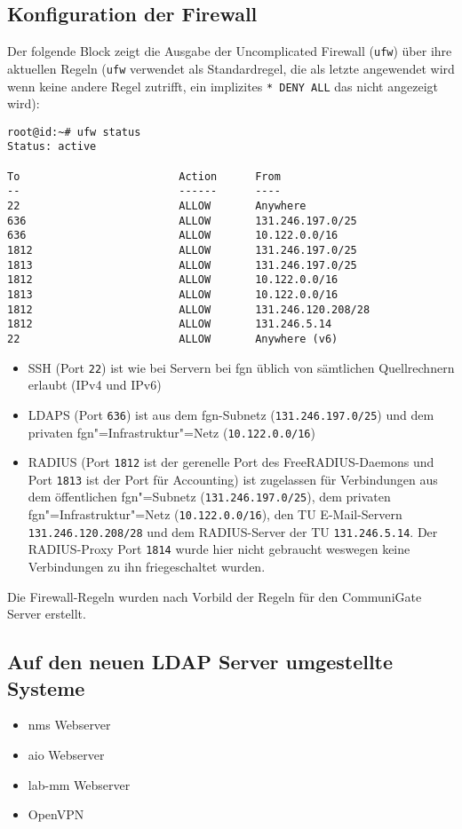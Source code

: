 \subsection{Konfiguration der Firewall}
Der folgende Block zeigt die Ausgabe der Uncomplicated Firewall (\texttt{ufw}) über ihre aktuellen Regeln (\texttt{ufw} verwendet als Standardregel, die als letzte angewendet wird wenn keine andere Regel zutrifft, ein implizites \texttt{* DENY ALL} das nicht angezeigt wird):
\begin{lstlisting}
root@id:~# ufw status
Status: active

To                         Action      From
--                         ------      ----
22                         ALLOW       Anywhere
636                        ALLOW       131.246.197.0/25
636                        ALLOW       10.122.0.0/16
1812                       ALLOW       131.246.197.0/25
1813                       ALLOW       131.246.197.0/25
1812                       ALLOW       10.122.0.0/16
1813                       ALLOW       10.122.0.0/16
1812                       ALLOW       131.246.120.208/28
1812                       ALLOW       131.246.5.14
22                         ALLOW       Anywhere (v6)
\end{lstlisting}
\begin{itemize}
\item SSH (Port \texttt{22}) ist wie bei Servern bei fgn üblich von sämtlichen Quellrechnern erlaubt (IPv4 und IPv6)
\item LDAPS (Port \texttt{636}) ist aus dem fgn-Subnetz (\texttt{131.246.197.0/25}) und dem privaten fgn"=Infrastruktur"=Netz (\texttt{10.122.0.0/16})
\item RADIUS (Port \texttt{1812} ist der gerenelle Port des FreeRADIUS-Daemons und Port \texttt{1813} ist der Port für Accounting) ist zugelassen für Verbindungen aus dem öffentlichen fgn"=Subnetz (\texttt{131.246.197.0/25}), dem privaten fgn"=Infrastruktur"=Netz (\texttt{10.122.0.0/16}), den TU E-Mail-Servern \texttt{131.246.120.208/28} und dem RADIUS-Server der TU \texttt{131.246.5.14}. Der RADIUS-Proxy Port \texttt{1814} wurde hier nicht gebraucht weswegen keine Verbindungen zu ihn friegeschaltet wurden.
\end{itemize}
Die Firewall-Regeln wurden nach Vorbild der Regeln für den CommuniGate Server erstellt.


\subsection{Auf den neuen LDAP Server umgestellte Systeme}
\begin{itemize}
\item nms Webserver
\item aio Webserver
\item lab-mm Webserver
\item OpenVPN
\end{itemize}

